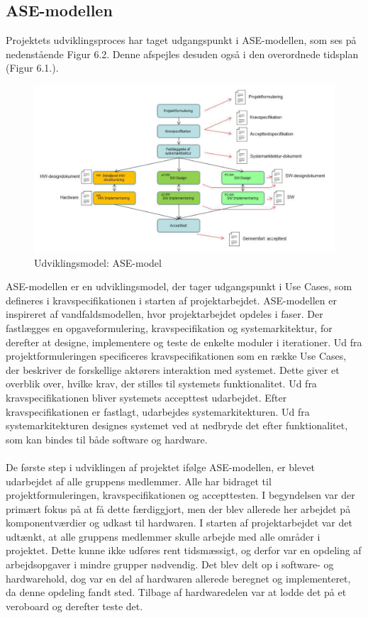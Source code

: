 \subsection{ASE-modellen}
Projektets udviklingsproces har taget udgangspunkt i ASE-modellen, som ses på nedenstående Figur 6.2. Denne afspejles desuden også i den overordnede tidsplan (Figur 6.1.). 
\begin{figure}[H]
	\centering
	\includegraphics[width=1\textwidth]{Figurer/asemodel}
	\caption{Udviklingsmodel: ASE-model \protect\cite[s. 6]{Vejledning}}
\end{figure}
ASE-modellen er en udviklingsmodel, der tager udgangspunkt i Use Cases, som defineres i kravspecifikationen i starten af projektarbejdet. ASE-modellen er inspireret af vandfaldsmodellen, hvor projektarbejdet opdeles i faser. Der fastlægges en opgaveformulering, kravspecifikation og systemarkitektur, for derefter at designe, implementere og teste de enkelte moduler i iterationer. Ud fra projektformuleringen specificeres kravspecifikationen som en række Use Cases, der beskriver de forskellige aktørers interaktion med systemet. Dette giver et overblik over, hvilke krav, der stilles til systemets funktionalitet. Ud fra kravspecifikationen bliver systemets accepttest udarbejdet. Efter kravspecifikationen er fastlagt, udarbejdes systemarkitekturen. Ud fra systemarkitekturen designes systemet ved at nedbryde det efter funktionalitet, som kan bindes til både software og hardware. \\\\
De første step i udviklingen af projektet ifølge ASE-modellen, er blevet udarbejdet af alle gruppens medlemmer. Alle har bidraget til projektformuleringen, kravspecifikationen og accepttesten. I begyndelsen var der primært fokus på at få dette færdiggjort, men der blev allerede her arbejdet på komponentværdier og udkast til hardwaren. I starten af projektarbejdet var det udtænkt, at alle gruppens medlemmer skulle arbejde med alle områder i projektet. Dette kunne ikke udføres rent tidsmæssigt, og derfor var en opdeling af arbejdsopgaver i mindre grupper nødvendig. Det blev delt op i software- og hardwarehold, dog var en del af hardwaren allerede beregnet og implementeret, da denne opdeling fandt sted. Tilbage af hardwaredelen var at lodde det på et veroboard og derefter teste det.\\\\

